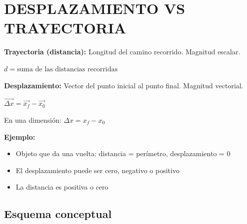 \section{DESPLAZAMIENTO VS TRAYECTORIA}
\begin{seccion}

\begin{definicion}
    \textbf{Trayectoria (distancia):} Longitud del camino recorrido. Magnitud escalar.
\end{definicion}

\begin{ecuacion}
    $d = \text{suma de las distancias recorridas}$
\end{ecuacion}

\begin{definicion}
    \textbf{Desplazamiento:} Vector del punto inicial al punto final. Magnitud vectorial.
\end{definicion}

\begin{ecuacion}
$\vec{\Delta x} = \vec{x_f} - \vec{x_0}$

En una dimensión:
$\Delta x = x_f - x_0$
\end{ecuacion}

\textbf{Ejemplo:}
\begin{itemize}
    \item Objeto que da una vuelta: distancia = perímetro, desplazamiento = 0
    \item El desplazamiento puede ser cero, negativo o positivo
    \item La distancia es positiva o cero
\end{itemize}
\end{seccion}

\subsection{Esquema conceptual}

\begin{center}
\end{center}


